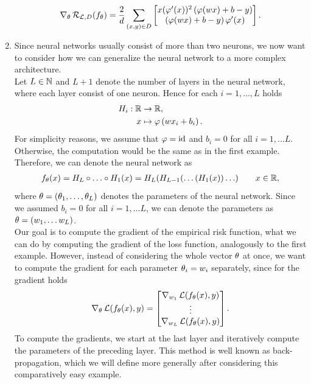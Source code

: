 \begin{example}
\begin{enumerate}
\begin{align*}
\nabla_{\theta} \operatorname{\mathcal{R}}_{\operatorname{\mathcal{L}}, D} (f_{\theta}) = \frac{2}{d} \sum_{(x,y)\in D} \left[ \begin{matrix}
x(\operatorname{\varphi}^{\prime}(x))^2\left(\operatorname{\varphi}(wx) + b - y \right)\\
\left(\operatorname{\varphi}(wx) + b - y \right) \operatorname{\varphi}^{\prime}(x)
\end{matrix}
\right].
\end{align*}
\item Since neural networks usually consist of more than two neurons, we now want to consider how we can generalize the neural network to a more complex architecture.\\
Let $L\in\operatorname{\mathbb{N}}$ and $L+1$ denote the number of layers in the neural network, where each layer consist of one neuron. Hence for each $i=1,\ldots, L$ holds
\begin{align*}
H_i: \operatorname{\mathbb{R}} &\to \operatorname{\mathbb{R}},\\
x &\mapsto \operatorname{\varphi}\left(wx_i + b_i\right).
\end{align*}
For simplicity reasons, we assume that $\operatorname{\varphi}=\mathrm{id}$ and $b_i=0$ for all $i=1,\ldots L$. Otherwise, the computation would be the same as in the first example. Therefore, we can denote the neural network as
\begin{align*}
f_\theta(x) = H_L \circ \ldots \circ H_1(x) = H_L(H_{L-1}(\ldots(H_1(x))\ldots) \qquad x\in\operatorname{\mathbb{R}},
\end{align*}
where $\theta=(\theta_1,\ldots,\theta_L)$ denotes the parameters of the neural network. Since we assumed $b_i=0$ for all $i=1,\ldots L$, we can denote the parameters as $\theta=(w_1,\ldots w_L)$.\\
Our goal is to compute the gradient of the empirical risk function, what we can do by computing the gradient of the loss function, analogously to the first example. However, instead of considering the whole vector $\theta$ at once, we want to compute the gradient for each parameter $\theta_i=w_i$ separately, since for the gradient holds
\begin{align*}
\nabla_\theta \operatorname{\mathcal{L}} (f_{\theta}(x), y) = \left[\begin{matrix}
\nabla_{w_1}\operatorname{\mathcal{L}} (f_{\theta}(x), y)\\
\vdots\\
\nabla_{w_L}\operatorname{\mathcal{L}} (f_{\theta}(x), y)
\end{matrix} \right].
\end{align*}
To compute the gradients, we start at the last layer and iteratively compute the parameters of the preceding layer. This method is well known as back-propagation, which we will define more generally after considering this comparatively easy example.\\

\end{enumerate}
\end{example}
